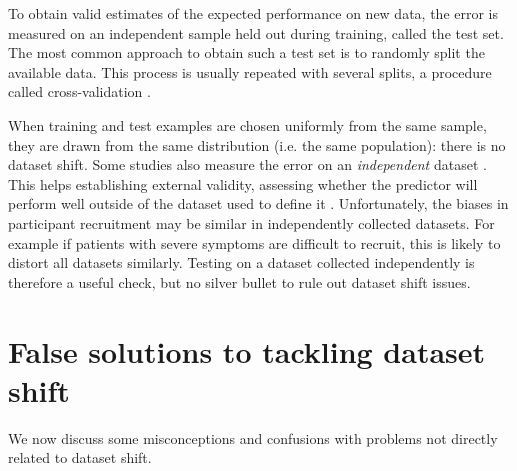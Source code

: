 \documentclass[twocolumn]{article}
\begin{document}
To obtain valid estimates of the expected performance on new data, the
error is measured on an independent sample held out during training, called the
test set.
%
The most common approach to obtain such a test set is to randomly split the
available data.
%
This process is usually repeated with several splits, a procedure called
cross-validation \citep[Sec. 7]{arlot2010survey,friedman2001elements}.
%

When training and test examples are chosen uniformly from the same sample, they
are drawn from the same distribution (i.e. the same population): there is no
dataset shift.
%
Some studies also measure the error on an \emph{independent} dataset
\citep[e.g.][]{beck2011systematic,jin2020generalizable}. This helps
establishing external validity, assessing
whether the predictor will perform well outside of the dataset used to
define it \citep{bleeker2003external}.
%
Unfortunately, the biases in participant recruitment may be similar
in independently collected datasets. For example if patients with severe
symptoms are difficult to recruit, this is likely to distort all datasets
similarly. Testing on a dataset collected independently is therefore a useful
check, but no silver bullet to rule out dataset shift issues.

\section{False solutions to tackling dataset shift}\label{sec:misconceptions}

We now discuss some misconceptions and
confusions with problems not directly related to dataset shift.
\end{document}
